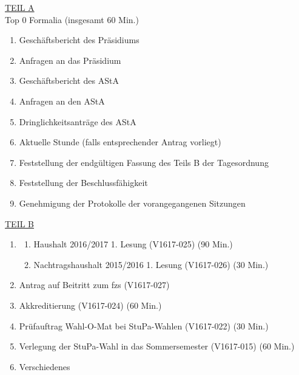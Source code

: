 \documentclass[ngerman,headheight=70pt]{scrartcl}
\begin{document}
    \underline{TEIL A}\\
    Top 0 Formalia (insgesamt 60 Min.)
    \begin{enumerate}
        \item Geschäftsbericht des Präsidiums
        \item Anfragen an das Präsidium
        \item Geschäftsbericht des AStA
        \item Anfragen an den AStA
        \item Dringlichkeitsanträge des AStA
        \item Aktuelle Stunde (falls entsprechender Antrag vorliegt)
        \item Feststellung der endgültigen Fassung des Teils B der Tagesordnung
        \item Feststellung der Beschlussfähigkeit
        \item Genehmigung der Protokolle der vorangegangenen Sitzungen
    \end{enumerate}
    \underline{TEIL B}\\
    \begin{enumerate}[label={\textbf{Top \theenumi}},leftmargin=*]
        \item
            \begin{enumerate}
                \item Haushalt 2016/2017 1. Lesung (V1617-025) (90 Min.)
                \item Nachtragshaushalt 2015/2016 1. Lesung (V1617-026) (30 Min.)
            \end{enumerate}
        \item Antrag auf Beitritt zum fzs (V1617-027)
        \item Akkreditierung (V1617-024) (60 Min.)
        \item Prüfauftrag Wahl-O-Mat bei StuPa-Wahlen (V1617-022) (30 Min.)
        \item Verlegung der StuPa-Wahl in das Sommersemester (V1617-015) (60 Min.)
        \item Verschiedenes
    \end{enumerate}
\end{document}
